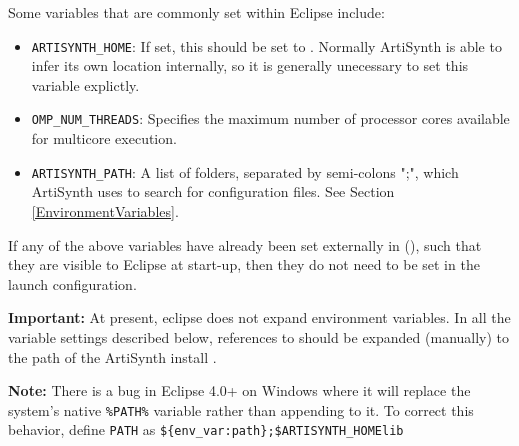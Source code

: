 Some variables that are commonly set within Eclipse include:

\begin{itemize}

\item {\tt ARTISYNTH\_HOME}: If set, this should be set to
\ArtHome[]. Normally ArtiSynth is able to infer its own location
internally, so it is generally unecessary to set this variable
explictly.

\item {\tt OMP\_NUM\_THREADS}: Specifies the maximum number of processor cores
available for multicore execution.

\item {\tt ARTISYNTH\_PATH}: A list of folders, separated by semi-colons ";", 
which ArtiSynth uses to search for configuration files. 
See Section \ref{EnvironmentVariables}.

\end{itemize}

If any of the above variables have already been set externally in
\SYSTEM{} (\environmentSectionRef), such that they are visible
to Eclipse at start-up, then they do not need to be set in the launch
configuration.


\ifNeedLibraryPath

\begin{sideblock}
{\bf Important:} At present, eclipse does not expand environment variables.
In all the variable settings described below, references to 
\ArtHome[]should be expanded (manually) to the path of the
ArtiSynth install \directory{}.
\end{sideblock}

\ifWindows
\begin{sideblock}
{\bf Note:} There is a bug in Eclipse 4.0+ on Windows where it will replace 
the system's native {\tt \%PATH\%} variable rather than appending to it.  
To correct this behavior, define {\tt PATH} as 
{\tt \$\{env\_var:path\};\$ARTISYNTH\_HOME\SEP lib\SEP \ARCH{}} 
\end{sideblock}
\fi
\fi

